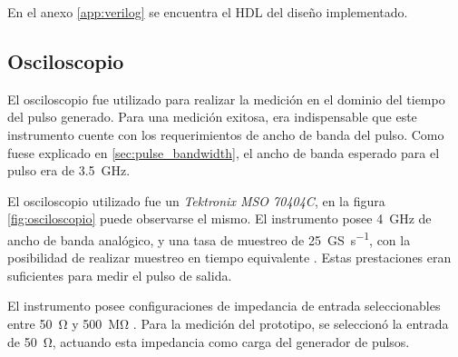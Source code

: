 En el anexo \ref{app:verilog} se encuentra el HDL del diseño implementado.

\subsection{Osciloscopio}

El osciloscopio fue utilizado para realizar la medición en el dominio del tiempo
del pulso generado. Para una medición exitosa, era indispensable que este
instrumento cuente con los requerimientos de ancho de banda del pulso. Como
fuese explicado en \ref{sec:pulse_bandwidth}, el ancho de banda esperado para el
pulso era de \qty{3.5}{\giga\hertz}.

El osciloscopio utilizado fue un \textit{Tektronix MSO 70404C}, en la figura
\ref{fig:osciloscopio} puede observarse el mismo. El instrumento posee
\qty{4}{\giga\hertz} de ancho de banda analógico, y una tasa de muestreo
de \qty[per-mode=symbol]{25}{\giga\siemens\per\second}, con la posibilidad de
realizar muestreo en tiempo equivalente \cite{oscilloscope_datasheet}. Estas
prestaciones eran suficientes para medir el pulso de salida.

El instrumento posee configuraciones de impedancia de entrada seleccionables entre
\qty{50}{\ohm} y \qty{500}{\mega\ohm} \cite{oscilloscope_datasheet}. Para la
medición del prototipo, se seleccionó la entrada de \qty{50}{\ohm}, actuando
esta impedancia como carga del generador de pulsos.

